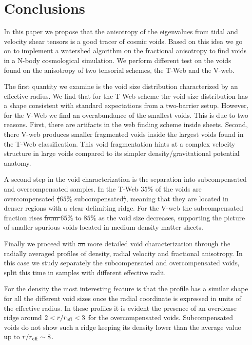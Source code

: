 \documentclass[a4,useAMS,usenatbib,usegraphicx]{mn2e}
\newcommand{\reff}{{\ifmmode{r_{\mbox{\tiny eff}}}\else{$r_{\mbox{\tiny eff}}$}\fi}}
\providecommand{\DIFaddtex}[1]{{\protect\color{blue}\uwave{#1}}} %
\providecommand{\DIFdeltex}[1]{{\protect\color{red}\sout{#1}}}                      %
\providecommand{\DIFaddbegin}{} %
\providecommand{\DIFaddend}{} %
\providecommand{\DIFdelbegin}{} %
\providecommand{\DIFdelend}{} %
\providecommand{\DIFadd}[1]{\texorpdfstring{\DIFaddtex{#1}}{#1}} %
\providecommand{\DIFdel}[1]{\texorpdfstring{\DIFdeltex{#1}}{}} %
\begin{document}
\section{Conclusions}
\label{sec:conclusions}

In this paper we propose that the anisotropy of the eigenvalues from
tidal and velocity shear tensors is a good tracer of  cosmic voids. 
Based on this idea we go on to implement a watershed
algorithm on the fractional anisotropy to find voids in a N-body
cosmological simulation.
We perform different test on the voids found on the anisotropy of two
tensorial schemes, the T-Web and the V-web.  

The first quantity we examine is the void size distribution
characterized by an effective radius. 
We find that for the T-Web scheme the void size distribution has a
shape consistent with standard expectations from a two-barrier setup. 
However, for the V-Web we find an overabundance of the smallest voids.
This is due to two reasons. 
First, there are artifacts in the web
finding scheme inside sheets. 
Second, there V-web produces smaller
fragmented voids inside the largest voids found in the T-Web
classification.  
This void fragmentation hints at a complex velocity structure in large
voids compared to its simpler density/gravitational potential anatomy.  

A second step in the void characterization 
is the separation into subcompensated and overcompensated samples. 
In the T-Web $35\%$ of the voids are overcompensated \DIFdelbegin \DIFdel{(}\DIFdelend \DIFaddbegin \DIFadd{and }\DIFaddend $65\%$
subcompensated\DIFdelbegin \DIFdel{)}\DIFdelend , meaning that they are located in denser regions with
a clear delimiting ridge.   
For the V-web the subcompensated fraction rises \DIFdelbegin \DIFdel{from $65\%$ }\DIFdelend to $85\%$ as the
void size decreases, supporting the picture of smaller spurious voids
located in medium density matter sheets.   

Finally we proceed with \DIFdelbegin \DIFdel{an }\DIFdelend \DIFaddbegin \DIFadd{a }\DIFaddend more detailed void characterization
through the radially averaged profiles of density, radial velocity and
fractional anisotropy. 
In this case we study separately the subcompensated and
overcompensated voids, split this time in samples with different
effective radii. 

For the density the most interesting feature is that the  profile has
a similar shape for all the different void sizes once the radial
coordinate is expressed in units of the effective radius.  
In these profiles it is evident the presence of an overdense ridge
around \DIFdelbegin \DIFdel{$2<r/r_{\rm eff}<3$ }\DIFdelend \DIFaddbegin \DIFadd{$2<r/\reff <3$ }\DIFaddend for the overcompensated voids.
Subcompensated voids do not show such a ridge keeping its density
lower than the average value up to \DIFdelbegin \DIFdel{$r/r_{\rm eff}\sim 8$}\DIFdelend \DIFaddbegin \DIFadd{$r/\reff \sim 8$}\DIFaddend .
\end{document}
